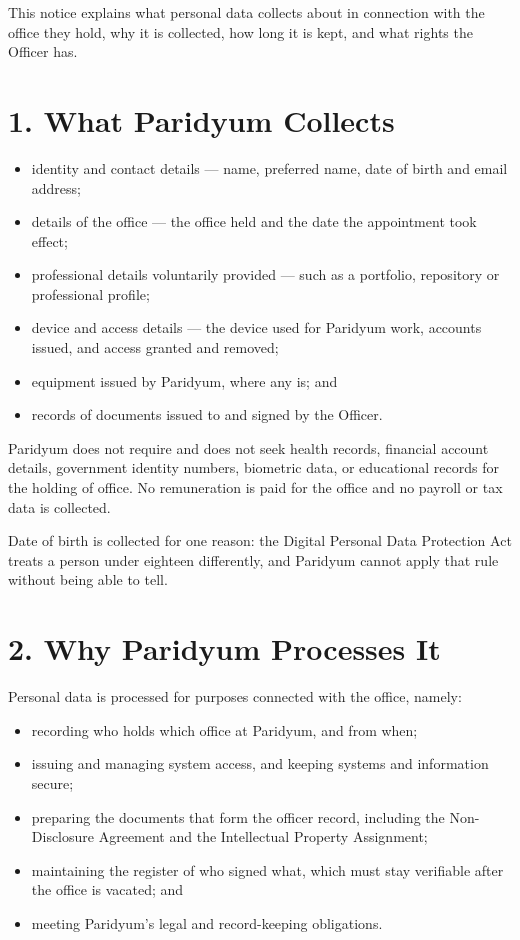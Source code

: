 \documentclass{paridyum}
\begin{document}
\paridyumletterhead
\paridyumdateref{\dkDocDate}{\dkDocRef}

This notice explains what personal data \textbf{\dkOrgName} collects about
\textbf{\dkPIdentityLegalName} in connection with the office they hold, why it is collected, how
long it is kept, and what rights the Officer has.

\section*{1. What Paridyum Collects}
\begin{itemize}[leftmargin=*, noitemsep]
    \item identity and contact details --- name, preferred name, date of birth and
          email address;
    \item details of the office --- the office held and the date the appointment took
          effect;
    \item professional details voluntarily provided --- such as a portfolio,
          repository or professional profile;
    \item device and access details --- the device used for Paridyum work, accounts
          issued, and access granted and removed;
    \item equipment issued by Paridyum, where any is; and
    \item records of documents issued to and signed by the Officer.
\end{itemize}

Paridyum does not require and does not seek health records, financial account details,
government identity numbers, biometric data, or educational records for the holding of
office. No remuneration is paid for the office and no payroll or tax data is collected.

Date of birth is collected for one reason: the Digital Personal Data Protection Act
treats a person under eighteen differently, and Paridyum cannot apply that rule without
being able to tell.

\section*{2. Why Paridyum Processes It}
Personal data is processed for purposes connected with the office, namely:
\begin{itemize}[leftmargin=*, noitemsep]
    \item recording who holds which office at Paridyum, and from when;
    \item issuing and managing system access, and keeping systems and information
          secure;
    \item preparing the documents that form the officer record, including the
          Non-Disclosure Agreement and the Intellectual Property Assignment;
    \item maintaining the register of who signed what, which must stay verifiable
          after the office is vacated; and
    \item meeting Paridyum's legal and record-keeping obligations.
\end{itemize}
\end{document}
